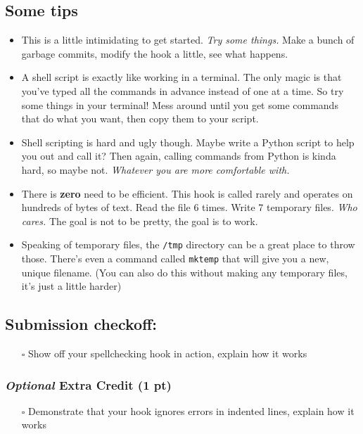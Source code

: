 \documentclass{article}
\begin{document}
\medskip

\subsection*{Some tips}
\begin{itemize}
  \item This is a little intimidating to get started. \emph{Try some things.}
    Make a bunch of garbage commits, modify the hook a little, see what
    happens.
  \item A shell script is exactly like working in a terminal. The only magic
    is that you've typed all the commands in advance instead of one at a time.
    So try some things in your terminal! Mess around until you get some
    commands that do what you want, then copy them to your script.
  \item Shell scripting is hard and ugly though. Maybe write a Python script
    to help you out and call it? Then again, calling commands from Python is
    kinda hard, so maybe not. \emph{Whatever you are more comfortable with.}
  \item There is \textbf{zero} need to be efficient. This hook is called
    rarely and operates on hundreds of bytes of text. Read the file 6 times.
    Write 7 temporary files. \emph{Who cares.} The goal is not to be pretty,
    the goal is to work.
  \item Speaking of temporary files, the \texttt{/tmp} directory can be a
    great place to throw those. There's even a command called \texttt{mktemp}
    that will give you a new, unique filename. (You can also do this without
    making any temporary files, it's just a little harder)
\end{itemize}

\subsection*{Submission checkoff:}
\begin{itemize}
  \item[$\square$] Show off your spellchecking hook in action, explain how it
    works
\end{itemize}

\subsubsection*{\emph{Optional} Extra Credit (1 pt)}
\begin{itemize}
  \item[$\square$] Demonstrate that your hook ignores errors in indented
    lines, explain how it works
\end{itemize}
\end{document}
